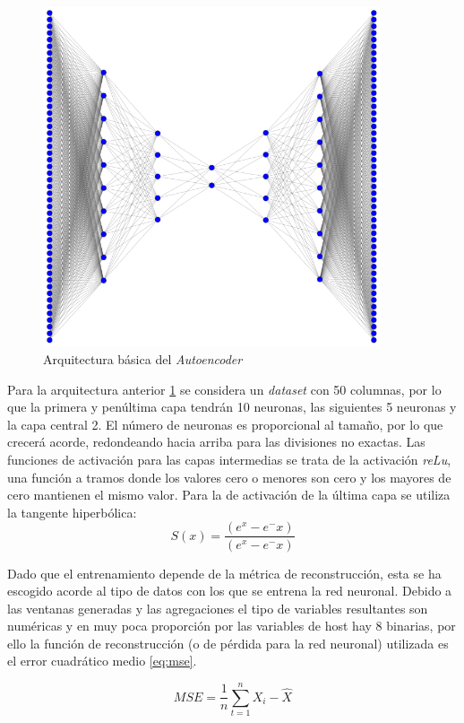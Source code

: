 \begin{figure}[h]
    \centering
    \includegraphics[width=10cm]{figs/ae_architecture.PNG}
    \caption{Arquitectura básica del \textit{Autoencoder}}
    \label{fig:ae_arch}
\end{figure}

Para la arquitectura anterior \ref{fig:ae_arch} se considera un \textit{dataset} con 50 columnas, por lo que la primera y penúltima capa tendrán 10 neuronas, las siguientes 5 neuronas y la capa central 2. El número de neuronas es proporcional al tamaño, por lo que crecerá acorde, redondeando hacia arriba para las divisiones no exactas. Las funciones de activación para las capas intermedias se trata de la activación \textit{reLu}, una función a tramos donde los valores cero o menores son cero y los mayores de cero mantienen el mismo valor. Para la de activación de la última capa se utiliza la tangente hiperbólica:
\begin{equation}
    S(x) = \frac{(e^x  - e^-x)}{(e^x  - e^-x)}
\end{equation}

Dado que el entrenamiento depende de la métrica de reconstrucción, esta se ha escogido acorde al tipo de datos con los que se entrena la red neuronal. Debido a las ventanas generadas y las agregaciones el tipo de variables resultantes son numéricas y en muy poca proporción por las variables de host hay 8 binarias, por ello la función de reconstrucción (o de pérdida para la red neuronal) utilizada es el error cuadrático medio \ref{eq:mse}.

\begin{equation}\label{eq:mse}
    MSE = \frac{1}{n}\sum_{t=1}^{n}X_i - \hat{X}
\end{equation}

